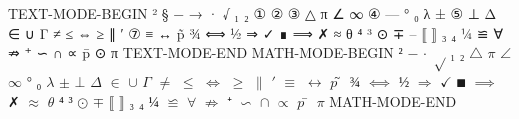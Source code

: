 \documentclass[fontset=none]{ctexart}
\begin{document}
\obeylines
TEXT-MODE-BEGIN
² § − → · √ ₁ ₂ ① ② ③ △ π ∠ ∞ ④ — ° ₀ λ ± ⑤ ⊥ Δ ∈ ∪ Γ ≠ ≤ ⇔ ≥ ∥ ′ ⑦ ≡ ↔ p̃ ¾ ⟺ ½ ⇒ ✓ ∎ ⟹ ✗ ≈ θ ⁴ ³ ⊙ ∓ – ⟦ ⟧ ₃ ₄ ¼ ≌ ∀ ⇏ ⁺ ∽ ∩ ∝ p̄ ⊙ π
TEXT-MODE-END
MATH-MODE-BEGIN
$²$ $−$ $·$ $√$ $₁$ $₂$ $△$ $π$ $∠$ $∞$ $°$ $₀$ $λ$ $±$ $⊥$ $Δ$ $∈$ $∪$ $Γ$ $≠$ $≤$ $⇔$ $≥$ $∥$ $′$ $≡$ $↔$ $p̃$ $¾$ $⟺$ $½$ $⇒$ $✓$ $∎$ $⟹$ $✗$ $≈$ $θ$ $⁴$ $³$ $⊙$ $∓$ $⟦$ $⟧$ $₃$ $₄$ $¼$ $≌$ $∀$ $⇏$ $⁺$ $∽$ $∩$ $∝$ $p̄$ $π$
MATH-MODE-END
\end{document}
